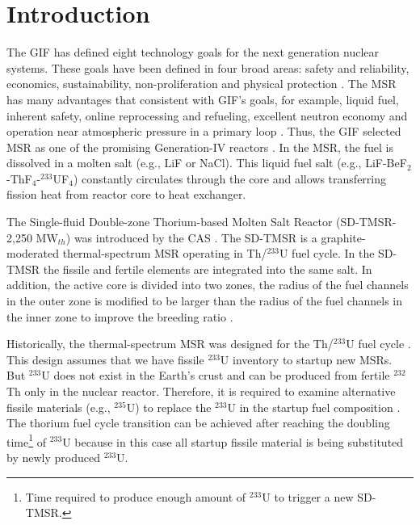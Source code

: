 \section{Introduction}
The \gls{GIF} has defined eight technology goals for the next generation
nuclear systems. These goals have been defined in four broad areas: safety and reliability, economics, sustainability, non-proliferation and physical protection \cite{doe2002technology}. The \gls{MSR} has many advantages that consistent
with \gls{GIF}'s goals, for example, liquid fuel, inherent safety, online
reprocessing and refueling, excellent neutron economy and operation near
atmospheric
pressure in a primary loop \cite{siemer2015molten,rosenthal1970molten}.
Thus, the \gls{GIF} selected \gls{MSR} as one of the promising Generation-IV
reactors \cite{doe2002technology,pioro2016handbook}.
In the \gls{MSR}, the fuel is dissolved in a molten salt (e.g., LiF or NaCl).
This liquid fuel salt (e.g., LiF-BeF$_2$-ThF$_4$-$^{233}$UF$_4$) constantly
circulates through the core and allows transferring fission heat from reactor
core to heat exchanger.

The Single-fluid Double-zone Thorium-based Molten Salt Reactor (SD-TMSR-2,250
MW$_{th}$) was introduced by the \gls{CAS} \cite{li_optimization_2018}. The
SD-TMSR
is a graphite-moderated thermal-spectrum \gls{MSR} operating in Th/$^{233}$U
fuel cycle. In the SD-TMSR the fissile and fertile elements are integrated
into the same salt. In addition, the active core is divided into two zones,
the radius of the fuel channels in the outer zone is modified to be larger
than the radius of the fuel channels in the inner zone to improve the breeding
ratio \cite{nuttin2005potential,li_optimization_2018}.

Historically, the thermal-spectrum \gls{MSR} was designed for the Th/$^{233}$U
fuel cycle \cite{rykhlevskii2019modeling,nuttin2005potential,
	merle2004scenarios,rosenthal1970molten}. This design assumes that we have
fissile $^{233}$U inventory to startup new \glspl{MSR}. But $^{233}$U does not
exist in the Earth's crust and can be produced from fertile $^{232}$Th only in
the nuclear reactor. Therefore, it is required to examine alternative fissile
materials (e.g., $^{235}$U) to replace the $^{233}$U in the startup fuel
composition \cite{betzler2016modeling,zou2018transition}. The thorium fuel
cycle transition can be achieved after reaching the doubling
time\footnote{Time required to produce enough amount of $^{233}$U to trigger a
	new SD-TMSR.} of $^{233}$U because in this case all startup fissile material
is being substituted by newly produced $^{233}$U.

